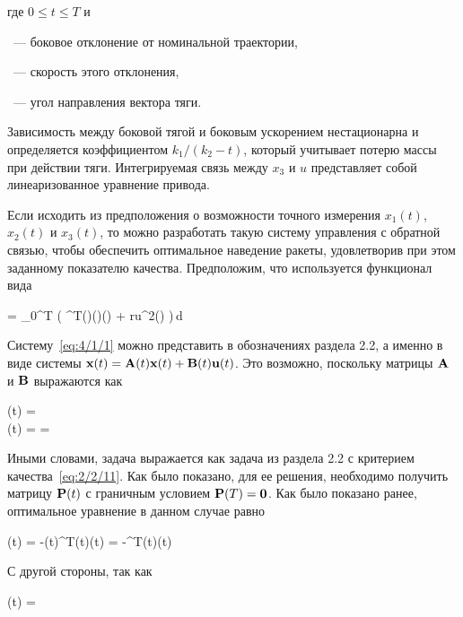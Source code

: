 где $0 \leqslant t \leqslant T$ и

\bdescr
    \item[$x_1$]~--- боковое отклонение от номинальной траектории,
    \item[$x_2$]~--- скорость этого отклонения,
    \item[$x_3$]~--- угол направления вектора тяги.
\edescr

Зависимость между боковой тягой и боковым ускорением нестационарна и определяется коэффициентом $k_1 / (k_2 - t)$, который учитывает потерю массы при действии тяги. Интегрируемая связь между $x_3$ и $u$ представляет собой линеаризованное уравнение привода.

Если исходить из предположения о возможности точного измерения $x_1(t)$, $x_2(t)$ и $x_3(t)$, то можно разработать такую систему управления с обратной связью, чтобы обеспечить оптимальное наведение ракеты, удовлетворив при этом заданному показателю качества. Предположим, что используется функционал вида

    \funcF =  \int\limits_0^T \bigl( ^T(\tau)(\tau)(\tau) + ru^2(\tau) \bigr)\,d\tau {}
\eeq

Систему~\ref{eq:4/1/1} можно представить в обозначениях раздела 2.2, а именно в виде системы $\mathbf{x}(t) = \mathbf{A}(t)\mathbf{x}(t) + \mathbf{B}(t)\mathbf{u}(t)$. Это возможно, поскольку матрицы $\mathbf{A}$ и $\mathbf{B}$ выражаются как

\beqarr
        (t) =  \text{;} \\
        (t) =  =  
\eeqarr

Иными словами, задача выражается как задача из раздела 2.2 с критерием качества~\vref{eq:2/2/11}. Как было показано, для ее решения, необходимо получить матрицу $\mathbf{P}(t)$ с граничным условием $\mathbf{P}(T) = \mathbf{0}$. Как было показано ранее, оптимальное уравнение в данном случае равно

    \optU(t) = -(t)^T(t)(t) = -^T(t)(t) 
\eeq

С другой стороны, так как

    (t) =  \text{,}
\eeq

